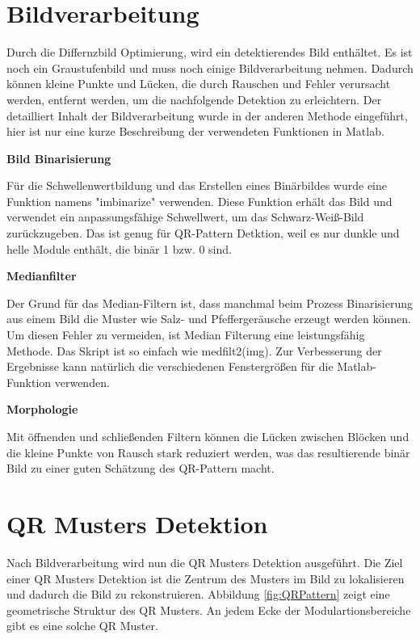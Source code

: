 \section{Bildverarbeitung} 
Durch die Differnzbild Optimierung, wird ein detektierendes Bild enthältet. Es ist noch ein Graustufenbild und muss noch einige Bildverarbeitung nehmen. Dadurch können kleine Punkte und Lücken, die durch Rauschen und Fehler verursacht werden, entfernt werden, um die nachfolgende Detektion zu erleichtern. Der detailliert Inhalt der Bildverarbeitung wurde in der anderen Methode eingeführt, hier ist nur eine kurze Beschreibung der verwendeten Funktionen in Matlab. 

\textbf{Bild Binarisierung}

Für die Schwellenwertbildung und das Erstellen eines Binärbildes wurde eine Funktion namens "imbinarize" verwenden. Diese Funktion erhält das Bild und verwendet ein anpassungsfähige Schwellwert, um das Schwarz-Weiß-Bild zurückzugeben. Das ist genug für QR-Pattern Detktion, weil es nur dunkle und helle Module enthält, die binär 1 bzw. 0 sind. 

\textbf{Medianfilter}

Der Grund für das Median-Filtern ist, dass manchmal beim Prozess Binarisierung aus einem Bild die Muster wie Salz- und Pfeffergeräusche erzeugt werden können. Um diesen Fehler zu vermeiden, ist Median Filterung eine leistungsfähig Methode. Das Skript ist so einfach wie medfilt2(img). Zur Verbesserung der Ergebnisse kann natürlich die verschiedenen Fenstergrößen für die Matlab-Funktion verwenden.

\textbf{Morphologie}

Mit öffnenden und schließenden Filtern können die Lücken zwischen Blöcken und die kleine Punkte von Rausch stark reduziert werden, was das resultierende binär Bild zu einer guten Schätzung des QR-Pattern macht. 

\section{QR Musters Detektion} 

Nach Bildverarbeitung wird nun die QR Musters Detektion ausgeführt. Die Ziel einer QR Musters Detektion ist die Zentrum des Musters im Bild zu lokalisieren und dadurch die Bild zu rekonstruieren. Abbildung \ref{fig:QRPattern} zeigt eine geometrische Struktur des QR Musters. An jedem Ecke der Modulartionsbereiche gibt es eine solche QR Muster.

